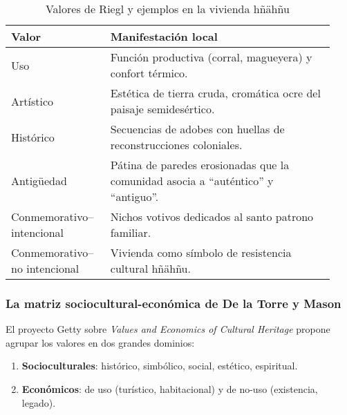 \begin{table}[ht]
	\centering
	\caption{Valores de Riegl y ejemplos en la vivienda hñähñu}
	\vspace{0.25cm}
	\label{tab:riegl_valores}
	\begin{tabular}{p{0.28\linewidth} p{0.65\linewidth}}
		\toprule
		\textbf{Valor}               & \textbf{Manifestación local}                            \\
		\midrule
		Uso                          & Función productiva (corral, magueyera) y
		confort térmico.                                                                       \\
		Artístico                    & Estética de tierra cruda, cromática ocre del
		paisaje semidesértico.                                                                 \\
		Histórico                    & Secuencias de adobes con huellas de reconstrucciones
		coloniales.                                                                            \\
		Antigüedad                   & Pátina de paredes erosionadas que la comunidad asocia a
		“auténtico” y “antiguo”.                                                               \\
		Conmemorativo–intencional    & Nichos votivos dedicados al santo patrono
		familiar.                                                                              \\
		Conmemorativo–no intencional & Vivienda como símbolo de resistencia
		cultural hñähñu.                                                                       \\
		\bottomrule
	\end{tabular}
\end{table}

\subsubsection{La matriz sociocultural-económica de De la Torre y Mason}

El proyecto Getty sobre \textit{Values and Economics of Cultural
	Heritage} propone agrupar los valores en dos grandes dominios:

\begin{enumerate}
	\item \textbf{Socioculturales}: histórico, simbólico, social,
	      estético, espiritual.
	\item \textbf{Económicos}: de uso (turístico, habitacional) y de
	      no-uso (existencia, legado).\citep{delatorre2002values}
\end{enumerate}

